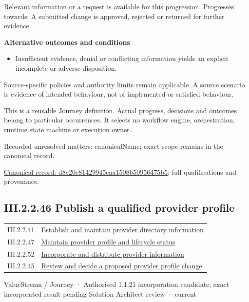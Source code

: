 Relevant information or a request is available for this progression. Progresses towards: A submitted change is approved, rejected or returned for further evidence.



\par\medskip\textbf{Alternative outcomes and conditions}\par


\begin{itemize}


\item Insufficient evidence, denial or conflicting information yields an explicit incomplete or adverse disposition.

\end{itemize}


Source-specific policies and authority limits remain applicable. A source scenario is evidence of intended behaviour, not of implemented or satisfied behaviour.



This is a reusable Journey definition. Actual progress, decisions and outcomes belong to particular occurrences. It selects no workflow engine, orchestration, runtime state machine or execution owner.


{\small Recorded unresolved matters: canonicalName; exact scope remains in the canonical record.}\par
{\footnotesize \href{../../../../continuum/strategy/value-stream/d8e20e81429945caa1508b50956475b5.md}{Canonical record: d8e20e81429945caa1508b50956475b5}; full qualifications and provenance.}\par
\subsection*{III.2.2.46 Publish a qualified provider profile}
\label{navigation:III.2.2.46}

\begin{longtable}{p{.22\linewidth}p{.73\linewidth}}
III.2.2.41 & \hyperref[element:679b0055ee5d42d4a838e35edd3de01f]{Establish and maintain provider directory information} \\
III.2.2.47 & \hyperref[element:79cb51c0f6184273af18b5e0bac64720]{Maintain provider profile and lifecycle status} \\
III.2.2.52 & \hyperref[element:9eb9f3210d5e4b46ac21463f54e62ab9]{Incorporate and distribute provider information} \\
III.2.2.45 & \hyperref[element:d8e20e81429945caa1508b50956475b5]{Review and decide a proposed provider profile change} \\
\end{longtable}
\label{element:4522e0c4204e4c0c93d2b1f9ef3887ad}
{\small ValueStream / Journey · Authorised 1.1.21 incorporation candidate; exact incorporated result pending Solution Architect review · current}\par

